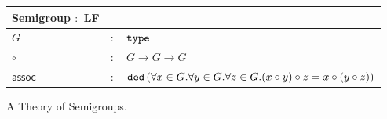 \begin{figure}[h]
  \begin{center}
    \begin{tabular}{|l c l|}
      \hline
      \textsf{Semigroup} $:$ \textsf{LF} & &\\\hline
      $G$ & $:$ & $ \typett$\\
      $\circ$ & $:$ & $ G \rightarrow G \rightarrow G$\\
      $ \mathsf{assoc}$& $:$ & $ \plaintt{ded}\left( \forall x \in G . \forall y \in G . \forall z \in G . (x\circ y)\circ z=x\circ (y\circ z) \right)$\\\hline
    \end{tabular}
  \end{center}

  \caption[A sample Theory of Semigroups]{
    A Theory of Semigroups.
  }
  \label{fig:theory}
\end{figure}